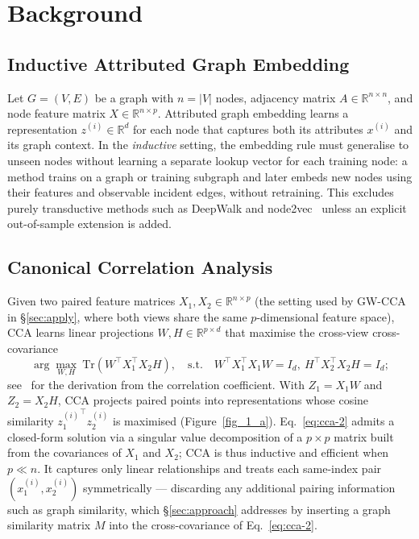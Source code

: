 \documentclass{article}
\begin{document}
\section{Background}
\label{sec:background}

\subsection{Inductive Attributed Graph Embedding}
Let $G = (V, E)$ be a graph with $n = |V|$ nodes, adjacency matrix
$A \in \mathbb{R}^{n \times n}$, and node feature matrix
$X \in \mathbb{R}^{n \times p}$. Attributed graph embedding learns a
representation $z^{(i)} \in \mathbb{R}^d$ for each node that captures
both its attributes $x^{(i)}$ and its graph context. In the
\emph{inductive} setting, the embedding rule must generalise to unseen
nodes without learning a separate lookup vector for each training node:
a method trains on a graph or training subgraph and later embeds new
nodes using their features and observable incident edges, without
retraining. This excludes purely transductive methods such as DeepWalk
and node2vec~\citep{perozzi2014deepwalk,grover2016node2vec} unless an
explicit out-of-sample extension is added.

\subsection{Canonical Correlation Analysis}
Given two paired feature matrices $X_1, X_2 \in \mathbb{R}^{n \times p}$
(the setting used by GW-CCA in \S\ref{sec:apply}, where both views share
the same $p$-dimensional feature space), CCA learns linear projections
$W, H \in \mathbb{R}^{p \times d}$ that maximise the cross-view
cross-covariance
\begin{equation}\label{eq:cca-2}
\arg\max_{W, H}\ \mathrm{Tr}(W^\top X_1^\top X_2 H),
\quad \text{s.t.}\quad W^\top X_1^\top X_1 W = I_d,\ H^\top X_2^\top X_2 H = I_d;
\end{equation}
see~\citet{hardoon2004canonical} for the derivation from the correlation
coefficient. With $Z_1 = X_1 W$ and $Z_2 = X_2 H$, CCA projects paired
points into representations whose cosine similarity
${z_1^{(i)}}^\top z_2^{(i)}$ is maximised (Figure~\ref{fig_1_a}).
Eq.~\ref{eq:cca-2} admits a closed-form solution via a singular value
decomposition of a $p \times p$ matrix built from the covariances of
$X_1$ and $X_2$; CCA is thus inductive and efficient when $p \ll n$. It
captures only linear relationships and treats each same-index pair
$(x_1^{(i)}, x_2^{(i)})$ symmetrically --- discarding any additional
pairing information such as graph similarity, which \S\ref{sec:approach}
addresses by inserting a graph similarity matrix $M$ into the
cross-covariance of Eq.~\ref{eq:cca-2}.
\end{document}
